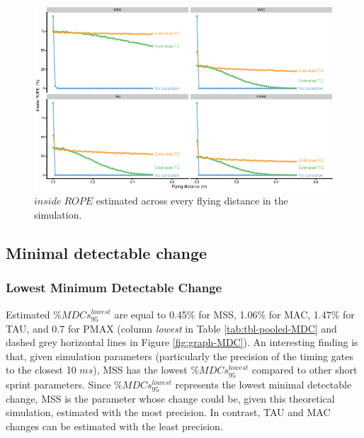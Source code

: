 \documentclass[fleqn,10pt]{wlpeerj} %
\begin{document}
\begin{figure}

{\centering \includegraphics[width=0.9\linewidth]{shorts-simulation-paper_files/figure-latex/graph-inside-ROPE-1} 

}

\caption{\(inside \; ROPE\) estimated across every flying distance in the simulation.}\label{fig:graph-inside-ROPE}
\end{figure}

\hypertarget{minimal-detectable-change}{%
\subsection{Minimal detectable change}\label{minimal-detectable-change}}

\hypertarget{lowest-minimum-detectable-change}{%
\subsubsection{Lowest Minimum Detectable Change}\label{lowest-minimum-detectable-change}}

Estimated \(\%MDCs_{95}^{lowest}\) are equal to 0.45\% for MSS, 1.06\% for MAC, 1.47\% for TAU, and 0.7 for PMAX (column \emph{lowest} in Table \ref{tab:tbl-pooled-MDC} and dashed grey horizontal lines in Figure \ref{fig:graph-MDC}). An interesting finding is that, given simulation parameters (particularly the precision of the timing gates to the closest 10 \(ms\)), MSS has the lowest \(\%MDCs_{95}^{lowest}\) compared to other short sprint parameters. Since \(\%MDCs_{95}^{lowest}\) represents the lowest minimal detectable change, MSS is the parameter whose change could be, given this theoretical simulation, estimated with the most precision. In contrast, TAU and MAC changes can be estimated with the least precision.
\end{document}
